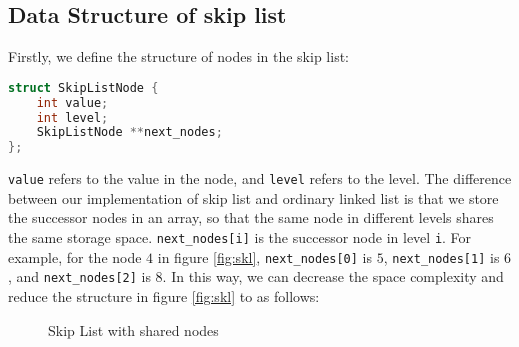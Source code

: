 \subsection{Data Structure of skip list}
Firstly, we define the structure of nodes in the skip list:
\begin{lstlisting}[language={C++}]
struct SkipListNode {
    int value;
    int level;
    SkipListNode **next_nodes;
};
\end{lstlisting}
\texttt{value} refers to the value in the node, and \texttt{level} refers to the level. The difference between our implementation of skip list and ordinary linked list is that we store the successor nodes in an array, so that the same node in different levels shares the same storage space. \texttt{next\_nodes[i]} is the successor node in level \texttt{i}. For example, for the node $4$ in figure \ref{fig:skl}, \texttt{next\_nodes[0]} is $5$, \texttt{next\_nodes[1]} is $6$, and \texttt{next\_nodes[2]} is $8$. In this way, we can decrease the space complexity and reduce the structure in figure \ref{fig:skl} to as follows:
\begin{figure}[H]
    \centering
    \caption{Skip List with shared nodes}\label{fig:skl2}
\end{figure}
